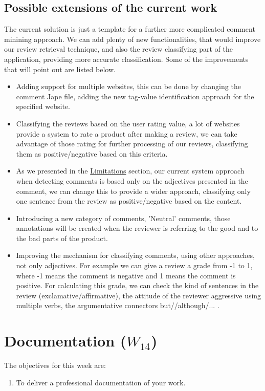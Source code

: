 \documentclass[a4paper,12pt]{report}
\begin{document}
\section{Possible extensions of the current work}

The current solution is just a template for a further more complicated comment minining approach. We can add plenty of new functionalities, that would improve our review retrieval technique, and also the review classifying part of the application, providing more accurate classification. Some of the improvements that will point out are listed below.
\begin{itemize}
 \item Adding support for multiple websites, this can be done by changing the comment Jape file, adding the new tag-value identification approach for the specified website.
 \item Classifying the reviews based on the user rating value, a lot of websites provide a system to rate a product after making a review, we can take advantage of those rating for further processing of our reviews, classifying them as positive/negative based on this criteria.
 \item As we presented in the \hyperref[sec:lim]{Limitations} section, our current system approach when detecting comments is based only on the adjectives presented in the comment, we can change this to provide a wider approach, classifying only one sentence from the review as positive/negative based on the content.
 \item Introducing a new category of comments, 'Neutral' comments, those annotations will be created when the reviewer is referring to the good and to the bad parts of the product.
 \item Improving the mechanism for classifying comments, using other approaches, not only adjectives. For example we can give a review a grade from -1 to 1, where -1 means the comment is negative and 1 means the comment is positive. For calculating this grade, we can check the kind of sentences in the review (exclamative/affirmative), the attitude of the reviewer aggressive using multiple verbs, the argumentative connectors but//although/... .
 
\end{itemize}


\chapter{Documentation ($W_{14}$)}
The objectives for this week are:
\begin{enumerate}
 \item To deliver a professional documentation of your work.
\end{enumerate}
\end{document}

